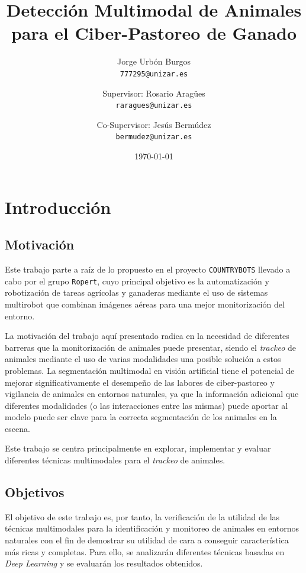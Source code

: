 \documentclass[12pt,a4paper]{report}
\title{Detección Multimodal de Animales para el Ciber-Pastoreo de Ganado}
\author{
    Jorge Urbón Burgos \\
    \texttt{777295@unizar.es}
    \and
    Supervisor: Rosario Aragües \\
    \texttt{raragues@unizar.es}
    \and
    Co-Supervisor: Jesús Bermúdez \\
    \texttt{bermudez@unizar.es}
}
\date{\today}
\begin{document}
\maketitle

\begin{abstract}
\end{abstract}

\tableofcontents

\chapter{Introducción}
\label{chap:introduction}

\section{Motivación}
\label{sec:motivation}
Este trabajo parte a raíz de lo propuesto en el proyecto \texttt{COUNTRYBOTS} llevado a cabo por el grupo \texttt{Ropert}, cuyo principal objetivo es la automatización y robotización de tareas agrícolas y ganaderas mediante el uso de sistemas multirobot que combinan imágenes aéreas para una mejor monitorización del entorno.

La motivación del trabajo aquí presentado radica en la necesidad de diferentes barreras que la monitorización de animales puede presentar, siendo el \textit{trackeo} de animales mediante el uso de varias modalidades una posible solución a estos problemas. La segmentación multimodal en visión artificial tiene el potencial de mejorar significativamente el desempeño de las labores de ciber-pastoreo y vigilancia de animales en entornos naturales, ya que la información adicional que diferentes modalidades (o las interacciones entre las mismas) puede aportar al modelo puede ser clave para la correcta segmentación de los animales en la escena.

Este trabajo se centra principalmente en explorar, implementar y evaluar diferentes técnicas multimodales para el \textit{trackeo} de animales.

\section{Objetivos}
\label{sec:objectives}
El objetivo de este trabajo es, por tanto, la verificación de la utilidad de las técnicas multimodales para la identificación y monitoreo de animales en entornos naturales con el fin de demostrar su utilidad de cara a conseguir característica más ricas y completas. Para ello, se analizarán diferentes técnicas basadas en \textit{Deep Learning} y se evaluarán los resultados obtenidos.
\end{document}
